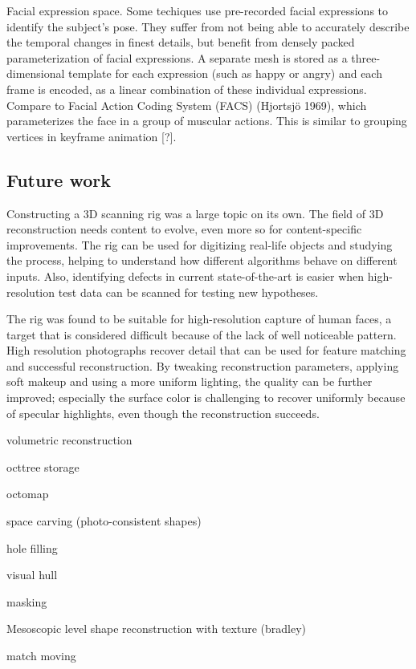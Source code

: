 Facial expression space. Some techiques \cite{faceshift,something} use pre-recorded facial expressions to identify the subject's pose.
They suffer from not being able to accurately describe the temporal changes in finest details, but benefit from densely packed parameterization of facial expressions.
A separate mesh is stored as a three-dimensional template for each expression (such as happy or angry) and each frame is encoded, as a linear combination of these individual expressions.
%
Compare to Facial Action Coding System (FACS) (Hjortsjö 1969), which parameterizes the face in a group of muscular actions. This is similar to grouping vertices in keyframe animation [?].
%
%

\subsection{Future work}




Constructing a 3D scanning rig was a large topic on its own.
The field of 3D reconstruction needs content to evolve, even more so for content-specific improvements.
The rig can be used for digitizing real-life objects and studying the process, helping to understand how different algorithms behave on different inputs.
Also, identifying defects in current state-of-the-art is easier when high-resolution test data can be scanned for testing new hypotheses.

The rig was found to be suitable for high-resolution capture of human faces, a target that is considered difficult because of the lack of well noticeable pattern.
High resolution photographs recover detail that can be used for feature matching and successful reconstruction.
By tweaking reconstruction parameters, applying soft makeup and using a more uniform lighting, the quality can be further improved;
especially the surface color is challenging to recover uniformly because of specular highlights, even though the reconstruction succeeds.


volumetric reconstruction

octtree storage

octomap

space carving (photo-consistent shapes)

hole filling

visual hull

masking

Mesoscopic level shape reconstruction with texture (bradley)

match moving
